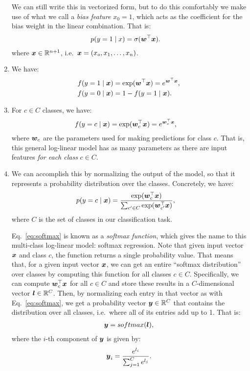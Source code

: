 \documentclass[11pt,a4paper]{article}
\begin{document}
\begin{enumerate}[label=(\alph*)]
          We can still write this in vectorized form, but to do this comfortably
          we make use of what we call a \emph{bias feature} $x_0=1$, which acts
          as the coefficient for the bias weight in the linear combination. That
          is:
          \begin{align}
              p(y=1\mid x) & = \sigma({\boldsymbol{w}}^\top{\boldsymbol{x}}).
          \end{align}
          where ${\boldsymbol{x}}\in\mathbb{R}^{n+1}$, i.e.\ ${\boldsymbol{x}}=(x_o, x_1, \ldots, x_n)$.
    \item We have:
          \begin{align}
              f(y=1\mid{\boldsymbol{x}}) & = \exp({\boldsymbol{w}}^\top{\boldsymbol{x}}) = e^{{\boldsymbol{w}}^\top{\boldsymbol{x}}}, \\
              f(y=0\mid{\boldsymbol{x}}) & = 1 - f(y=1\mid{\boldsymbol{x}}).
          \end{align}
    \item For $c\in C$ classes, we have:
          \begin{align}\label{eq:log_linear}
              f(y=c\mid{\boldsymbol{x}}) & = \exp({\boldsymbol{w}}_c^\top{\boldsymbol{x}}) = e^{{\boldsymbol{w}}_c^\top{\boldsymbol{x}}},
          \end{align}
          where ${\boldsymbol{w}}_c$ are the parameters used for making predictions for class
          $c$.
          That is, this general log-linear model has as many parameters as there
          are input features \emph{for each class} $c\in C$.
    \item We can accomplish this by normalizing the output of the model, so that
          it represents a probability distribution over the classes.
          Concretely, we have:
          \begin{align}\label{eq:softmax}
              p(y=c\mid{\boldsymbol{x}}) & = \frac{\exp({\boldsymbol{w}}_c^\top{\boldsymbol{x}})}{\sum_{c'\in C}\exp({\boldsymbol{w}}_{c'}^\top{\boldsymbol{x}})},
          \end{align}
          where $C$ is the set of classes in our classification task.

          Eq.~\ref{eq:softmax} is known as a \emph{softmax function}, which
          gives the name to this multi-class log-linear model: softmax
          regression.
          Note that given input vector ${\boldsymbol{x}}$ and class $c$, the function returns
          a single probability value. That means that, for a given input vector
          ${\boldsymbol{x}}$, we can get an entire ``softmax distribution'' over classes by
          computing this function for all classes $c\in C$.
          Specifically, we can compute ${\boldsymbol{w}}_c^\top{\boldsymbol{x}}$ for all $c\in C$ and 
          store these results in a $C$-dimensional vector ${\boldsymbol{l}}\in\mathbb{R}^C$.
          Then, by normalizing each entry in that vector as with
          Eq.~\ref{eq:softmax}, we get a probability vector ${\boldsymbol{y}}\in\mathbb{R}^C$
          that contains the distribution over all classes, i.e.\ where all of
          its entries add up to 1.
          That is:
          \begin{align}
              {\boldsymbol{y}} = softmax({\boldsymbol{l}}),
          \end{align}
          where the $i$-th component of ${\boldsymbol{y}}$ is given by:
          \begin{align}
              {\boldsymbol{y}}_i = \frac{e^{l_i}}{\sum_{j=1}^{C}e^{l_j}}.
          \end{align}


\end{enumerate}
\end{document}

